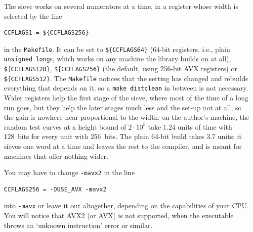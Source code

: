 \documentclass[12pt,a4paper,oneside]{amsart}
\begin{document}
The sieve works on several numerators at a time, in a register whose width is
selected by the line
\begin{verbatim}
CCFLAGS1 = ${CCFLAGS256}
\end{verbatim}
in the \texttt{Makefile}. It can be set to \verb+${CCFLAGS64}+ (64-bit
registers, i.e., plain \texttt{unsigned long}s, which works on any machine
the library builds on at all), \verb+${CCFLAGS128}+,
\verb+${CCFLAGS256}+ (the default, using 256-bit AVX registers) or
\verb+${CCFLAGS512}+. The \texttt{Makefile} notices that the setting has
changed and rebuilds everything that depends on it, so a \texttt{make
distclean} in between is not necessary. Wider
registers help the first stage of the sieve, where most of the time of a
long run goes, but they help the later stages much less and the set-up not
at all, so the gain is nowhere near proportional to the width: on the
author's machine, the random test curves at a height bound of $2\cdot10^5$
take $1.24$ units of time with 128~bits for every unit with 256~bits. The
plain 64-bit build takes $3.7$ units; it sieves one word at a time and leaves
the rest to the compiler, and is meant for machines that offer nothing
wider.


You may have to change \verb+-mavx2+ in the line
\begin{verbatim}
CCFLAGS256 = -DUSE_AVX -mavx2
\end{verbatim}
into \verb+-mavx+ or leave it out altogether, depending on the capabilities
of your CPU. You will notice that AVX2 (or AVX) is not supported, when the
executable throws an `unknown instruction' error or similar.
\end{document}
